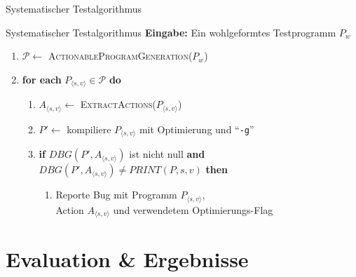 ﻿\documentclass{beamer}
\begin{document}
\begin{frame}[fragile]{Systematischer Testalgorithmus}
  \begin{block}{Systematischer Testalgorithmus}
    \textbf{Eingabe:} Ein wohlgeformtes Testprogramm $P_w$ \\
    \begin{enumerate}
      \item $\mathcal{P} \leftarrow$ \textsc{ActionableProgramGeneration}($P_w$)
      \item \textbf{for each} $P_{\langle s,v\rangle} \in \mathcal{P}$ \textbf{do}
        \begin{enumerate}
          \item $A_{\langle s,v\rangle} \leftarrow$ \textsc{ExtractActions}($P_{\langle s,v\rangle}$)
          \item $P' \leftarrow$ kompiliere $P_{\langle s,v\rangle}$ mit Optimierung und ``\texttt{-g}''
          \item \textbf{if} $\mathit{DBG}(P', A_{\langle s,v\rangle})$ ist nicht null \textbf{and} \\
            $\mathit{DBG}(P', A_{\langle s,v\rangle}) \neq \mathit{PRINT}(P, s, v)$ \textbf{then}
            \begin{enumerate}
              \item Reporte Bug mit Programm $P_{\langle s,v\rangle}$, \\
                Action $A_{\langle s,v\rangle}$ und verwendetem Optimierungs-Flag
            \end{enumerate}
        \end{enumerate}
    \end{enumerate}
  \end{block}
\end{frame}

\section{Evaluation \& Ergebnisse}
\end{document}
